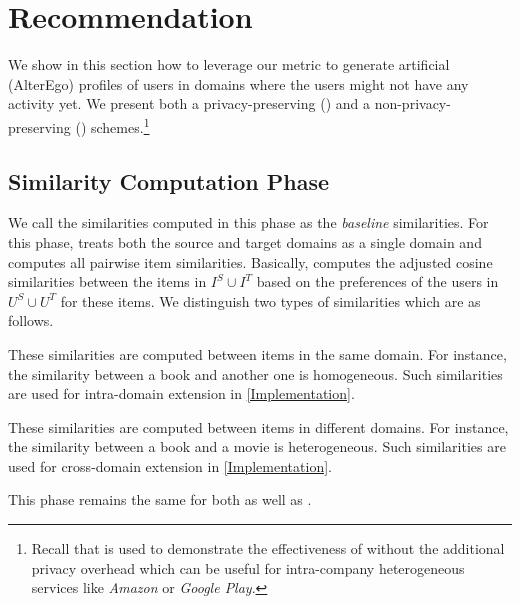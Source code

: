\vspace{-2mm}
\section{Recommendation}
\label{Recommendation}
We show in this section how to leverage our \graphsim metric to generate artificial (AlterEgo) profiles of users in domains where the users might not have any activity yet. We present both a privacy-preserving (\crossrec) and a non-privacy-preserving (\npcrossrec) schemes.\footnote{Recall that \npcrossrec is used to demonstrate the effectiveness of \graphsim without the additional privacy overhead which can be useful for intra-company heterogeneous services like \emph{Amazon} or \emph{Google Play}.}  

\subsection{Similarity Computation Phase}
We call the similarities computed in this phase as the \emph{baseline} similarities. For this phase, \crossrec treats both the source and target domains as a single domain and computes all pairwise item similarities. Basically, \crossrec computes the adjusted cosine similarities between the items in $I^S \cup I^T$ based on the preferences of the users in $U^S \cup U^T$ for these items. We distinguish two types of similarities which are as follows.

 These similarities are computed between items in the same domain. For instance, the similarity between a book and another one is homogeneous. Such similarities are used for intra-domain extension in \autoref{Implementation}.

 These similarities are computed between items in different domains. For instance, the similarity between a book and a movie is heterogeneous. Such similarities are used for cross-domain extension in \autoref{Implementation}.

This phase remains the same for both \crossrec as well as \npcrossrec.


